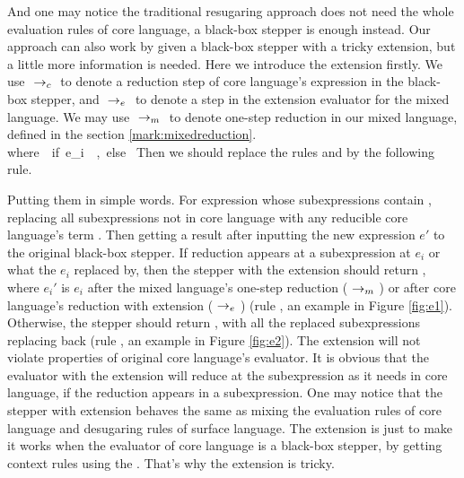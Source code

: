 \label{mark:blackbox}
And one may notice the traditional resugaring approach does not need the whole evaluation rules of core language, a black-box stepper is enough instead. Our approach can also work by  given a black-box stepper with a tricky extension, but a little more information is needed. Here we introduce the extension firstly.
We use $~\rightarrow_c~$ to denote a reduction step of core language's expression in the black-box stepper, and $~\rightarrow_e~$ to denote a step in the extension evaluator for the mixed language. We may use $~\rightarrow_m~$ to denote one-step reduction in our mixed language, defined in the section \ref{mark:mixedreduction}.
{}
{\\where~~if~e_i~\in~,~else~}
{}
Then we should replace the rules  and  by the following rule.
{}

Putting them in simple words. For expression  whose subexpressions contain , replacing all  subexpressions not in core language with any reducible core language's term . Then getting a result after inputting the new expression $e'$ to the original black-box stepper. If reduction appears at a subexpression at $e_i$ or what the $e_i$ replaced by, then the stepper with the extension should return , where $e_i'$ is $e_i$ after the mixed language's one-step reduction ($~\rightarrow_m~$) or after core language's reduction with extension ($~\rightarrow_e~$) (rule , an example in Figure \ref{fig:e1}). Otherwise, the stepper should return , with all the replaced subexpressions replacing back (rule , an example in Figure \ref{fig:e2}). The extension will not violate properties of original core language's evaluator. It is obvious that the evaluator with the extension will reduce at the subexpression as it needs in core language, if the reduction appears in a subexpression. One may notice that the stepper with extension behaves the same as mixing the evaluation rules of core language and desugaring rules of surface language. The extension is just to make it works when the evaluator of core language is a black-box stepper, by getting context rules using the . That's why the extension is tricky.

